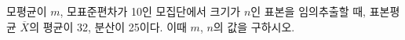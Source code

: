 모평균이 $m$, 모표준편차가 10인 모집단에서 크기가 $n$인 표본을 임의추출할 때, 표본평균 $\overline{X}$의 평균이 32, 분산이 25이다. 이때 $m$, $n$의 값을 구하시오.
